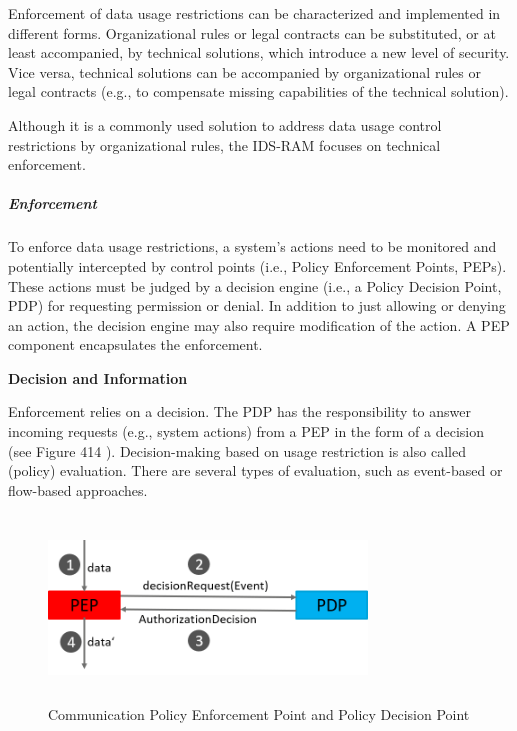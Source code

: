 

Enforcement of data usage restrictions can be characterized and implemented in different forms. Organizational rules or legal contracts can be substituted, or at least accompanied, by technical solutions, which introduce a new level of security. Vice versa, technical solutions can be accompanied by organizational rules or legal contracts (e.g., to compensate missing capabilities of the technical solution).

Although it is a commonly used solution to address data usage control restrictions by organizational rules, the IDS-RAM focuses on technical enforcement.

\subparagraph*{ Enforcement\\}
To enforce data usage restrictions, a system’s actions need to be monitored and potentially intercepted by control points (i.e., Policy Enforcement Points, PEPs). These actions must be judged by a decision engine (i.e., a Policy Decision Point, PDP) for requesting permission or denial. In addition to just allowing or denying an action, the decision engine may also require modification of the action. A PEP component encapsulates the enforcement.


\textbf{Decision and Information\\}


Enforcement relies on a decision. The PDP has the responsibility to answer incoming requests (e.g., system actions) from a PEP in the form of a decision (see  Figure 414 ). Decision-making based on usage restriction is also called (policy) evaluation. There are several types of evaluation, such as event-based or flow-based approaches.




\begin{figure}[H]
	\begin{Center}
		\includegraphics[width=3.33in,height=1.94in]{./media/image70.png}
		\caption{Communication Policy Enforcement Point and Policy Decision Point}
		\label{fig:Communication_Policy_Enforcement_Point_and_Policy_Decision Point}
	\end{Center}
\end{figure}


